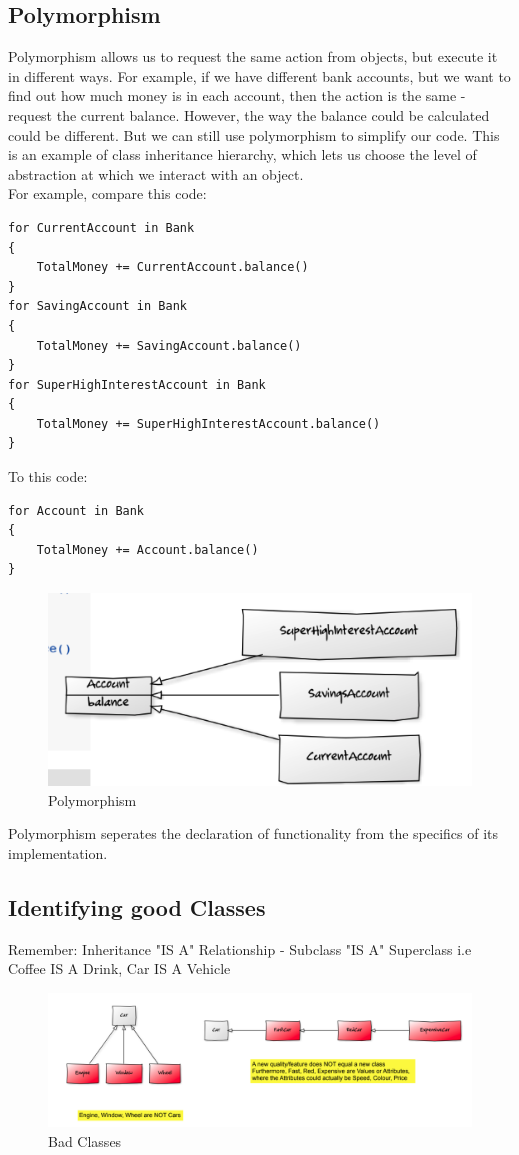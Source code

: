 \documentclass{article}
\begin{document}
\subsection{Polymorphism}
Polymorphism allows us to request the same action from objects, but execute it in different ways. For example, if we have different bank accounts, but we want to find out how much money is in each account, then the action is the same - request the current balance. However, the way the balance could be calculated could be different. But we can still use polymorphism to simplify our code. This is an example of class inheritance hierarchy, which lets us choose the level of abstraction at which we interact with an object. \\ For example, compare this code:
\begin{verbatim}
for CurrentAccount in Bank 
{
    TotalMoney += CurrentAccount.balance()
}
for SavingAccount in Bank 
{
    TotalMoney += SavingAccount.balance()
}
for SuperHighInterestAccount in Bank 
{
    TotalMoney += SuperHighInterestAccount.balance()
}
\end{verbatim}
To this code:
\begin{verbatim}
for Account in Bank
{
    TotalMoney += Account.balance()
}
\end{verbatim}
\begin{figure}[H]
\centering
\includegraphics[width = 0.5\linewidth]{Pictures/Screenshot 2023-01-25 at 13.33.03.png}
\caption{Polymorphism}
\end{figure}
Polymorphism seperates the declaration of functionality from the specifics of its implementation.
\subsection{Identifying good Classes}
Remember: Inheritance "IS A" Relationship - Subclass "IS A" Superclass i.e Coffee IS A Drink, Car IS A Vehicle
\begin{figure}[H]
\centering
\includegraphics[width = 0.8\linewidth]{Pictures/Screenshot 2023-01-25 at 13.36.04.png}
\caption{Bad Classes}
\end{figure}
\end{document}
